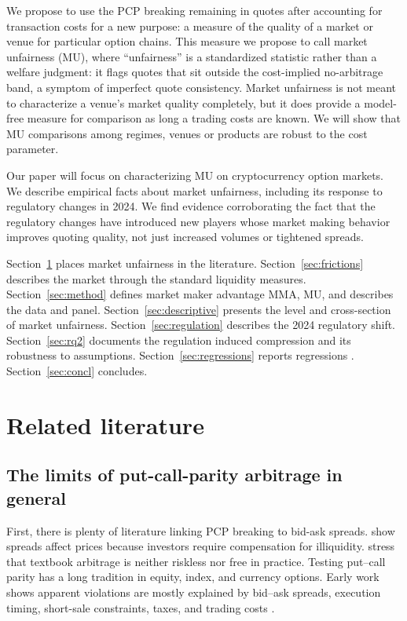 \documentclass[12pt]{article}
\begin{document}
We propose to use the PCP breaking remaining in quotes after accounting for transaction costs for a new purpose: a measure of the quality of a market or venue for particular option chains. This measure we propose to call market unfairness (MU), where ``unfairness'' is a standardized statistic rather than a welfare judgment: it flags quotes that sit outside the cost-implied no-arbitrage band, a symptom of imperfect quote consistency. Market unfairness is not meant to characterize a venue's market quality completely, but it does provide a model-free measure for comparison as long a trading costs are known. We will show that MU comparisons among regimes, venues or products are robust to the cost parameter.

Our paper will focus on characterizing MU on cryptocurrency option markets. We describe empirical facts about market unfairness, including its response to regulatory changes in 2024. We find evidence corroborating the fact that the regulatory changes have introduced new players whose market making behavior improves quoting quality, not just increased volumes or tightened spreads.


Section~\ref{sec:lit} places market unfairness in the literature. Section~\ref{sec:frictions} describes the market through the standard liquidity measures. Section~\ref{sec:method} defines market maker advantage MMA,  MU, and describes the data and panel. Section~\ref{sec:descriptive} presents the level and cross-section of market unfairness. Section~\ref{sec:regulation} describes the 2024 regulatory shift. Section~\ref{sec:rq2} documents the regulation induced compression and its robustness to assumptions. Section~\ref{sec:regressions} reports regressions . Section~\ref{sec:concl} concludes.

\clearpage
\section{Related literature}
\label{sec:lit}

\subsection{The limits of put-call-parity arbitrage in general}

First, there is plenty of literature linking PCP breaking to bid-ask spreads.  \citet{amihud1986asset} show spreads affect prices because investors require compensation for illiquidity. \citet{shleifer1997limits} stress that textbook arbitrage is neither riskless nor free in practice. Testing put--call parity has a long tradition in equity, index, and currency options. Early work shows apparent violations are mostly explained by bid--ask spreads, execution timing, short-sale constraints, taxes, and trading costs \citep{klemkosky1979put, nisbet1992put, kamara1995daily, el1998put, cremers2010deviations}.
\end{document}
